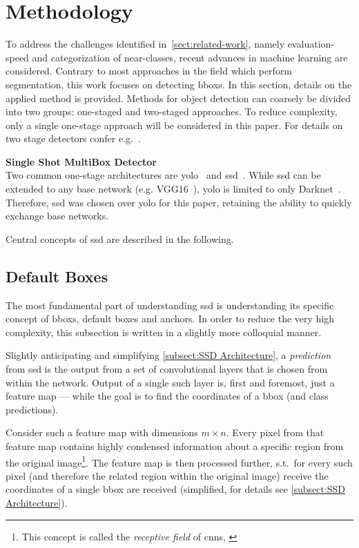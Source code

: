 \section{Methodology}\label{sect:methodology}
To address the challenges identified in~\cref{sect:related-work}, namely
evaluation-speed and categorization of near-classes, recent advances in machine
learning are considered. Contrary to most approaches in the field which perform
segmentation, this work focuses on detecting \glspl{bbox}. In this section,
details on the applied method is provided. Methods for object detection can coarsely
be divided into two groups: one-staged and two-staged approaches. To reduce complexity,
only a single one-stage approach will be considered in this paper. For details on
two stage detectors confer e.g.\ \cite{Ren.2015}.

\bigskip
{\large{\textbf{Single Shot MultiBox Detector}}}\\
Two common one-stage architectures are
\gls{yolo}~\cite{Redmon.2015, Redmon.2016b, Redmon.2018} and
\gls{ssd}~\cite{Liu.2016}. While \gls{ssd} can be extended to any base network
(e.g. VGG16~\cite{Simonyan.2015}), \gls{yolo} is limited to only Darknet~\cite{Redmon.2016}.
Therefore, \gls{ssd} was chosen over \gls{yolo} for this paper, retaining the
ability to quickly exchange base networks.

Central concepts of \gls{ssd} are described in the following.

\subsection{Default Boxes}\label{subsect:default-boxes}
The most fundamental part of understanding \gls{ssd} is understanding its specific
concept of \glspl{bbox}, default boxes and anchors. In order to reduce the very high
complexity, this subsection is written in a slightly more colloquial manner.

Slightly anticipating and simplifying \cref{subsect:SSD Architecture}, a
\emph{prediction} from \gls{ssd} is the output from a set of \glspl{convolutional layer}
that is chosen from within the network. Output of a single such \gls{layer} is,
first and foremost, just a \gls{feature map} --- while the goal is to find the
coordinates of a \gls{bbox} (and class predictions). 

Consider such a \gls{feature map} with dimensions \(m \times n\). Every pixel
from that \gls{feature map} contains highly condensed information about a specific
region from the original image\footnote{This concept is called the
\emph{receptive field} of \glspl{cnn}, \cite[cf.][331\psq]{Goodfellow.2016}}.
The \gls{feature map} is then processed further, s.t.\ for every such
pixel (and therefore the related region within the original image) receive the
coordinates of a single \gls{bbox} are received (simplified, for details see \cref{subsect:SSD Architecture}).

